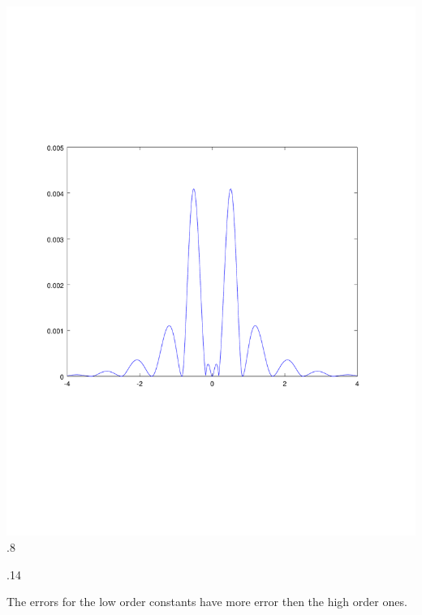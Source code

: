 \documentclass[12pt]{article}
\makeatletter
\theoremstyle{homework}
\newenvironment{exercise}[1]
{\def\@currentlabel{#1}\exercisecore}
{\endexercisecore}
\makeatother
\begin{document}
\includegraphics[scale=.7]{../octave/herm2.pdf}
\begin{exercise}

8.8
\end{exercise}



\begin{exercise}

7.14
\end{exercise}


The errors for the low order constants have more error then the high order ones.
\end{document}
